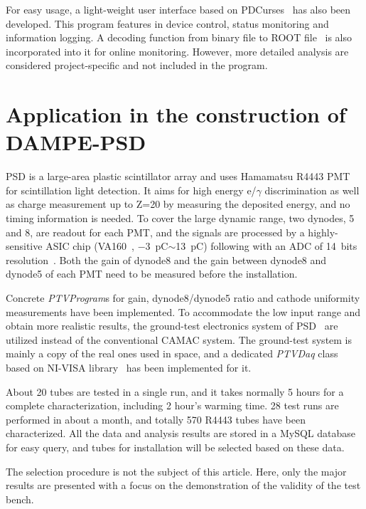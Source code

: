 \documentclass[a4paper,10pt,twoside]{cpc-hepnp}
\begin{document}
\begin{CJK*}{UTF8}{gbsn}
\begin{multicols}{2}
For easy usage, a light-weight user interface based on PDCurses~\citep{pdcurses} has also been developed.
This program features in device control, status monitoring and information logging.
A decoding function from binary file to ROOT file~\citep{root} is also incorporated into it for online monitoring.
However, more detailed analysis are considered project-specific and not included in the program. 

\section{Application in the construction of DAMPE-PSD}
\label{sec:application}

PSD is a large-area plastic scintillator array and uses Hamamatsu R4443 PMT for scintillation light detection.
It aims for high energy e/$\gamma$ discrimination as well as charge measurement up to Z=20 by measuring the deposited energy, and no timing information is needed.
To cover the large dynamic range, two dynodes, 5 and 8, are readout for each PMT, 
and the signals are processed by a highly-sensitive ASIC chip (VA160~\citep{va160}, \SI{-3}{\pico\coulomb}$\sim$\SI{13}{\pico\coulomb}) following with an ADC of 14~bits resolution~\citep{fee}. 
Both the gain of dynode8 and the gain between dynode8 and dynode5 of each PMT need to be  measured before the installation.

Concrete \textit{PTVProgram}s for gain, dynode8/dynode5 ratio and cathode uniformity measurements have been implemented.
To accommodate the low input range and obtain more realistic results, the ground-test electronics system of PSD~\citep{fee} are utilized instead of the conventional CAMAC system. 
The ground-test system is mainly a copy of the real ones used in space, and a dedicated \textit{PTVDaq} class based on NI-VISA library~\citep{ni_visa} has been implemented for it.

About 20 tubes are tested in a single run, and it takes normally 5 hours for a complete characterization, including 2 hour's warming time. 
28 test runs are performed in about a month, and totally 570 R4443 tubes have been characterized. 
All the data and analysis results are stored in a MySQL database for easy query, and tubes for installation will be selected based on these data.

The selection procedure is not the subject of this article.
Here, only the major results are presented with a focus on the demonstration of the validity of the test bench. 


\end{multicols}
\end{CJK*}
\end{document}
